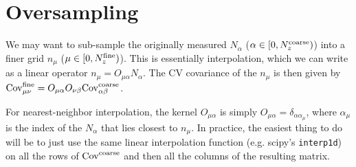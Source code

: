 \documentclass[a4paper,11pt]{article}
\begin{document}
\appendix
\section{Oversampling}
We may want to sub-sample the originally measured $N_{\alpha}$ ($\alpha\in[0,N_z^{\rm coarse})$) into a finer grid $n_{\mu}$ ($\mu\in[0,N_z^{\rm fine})$). This is essentially interpolation, which we can write as a linear operator $n_\mu = O_{\mu\alpha}N_{\alpha}$. The CV covariance of the $n_\mu$ is then given by ${\rm Cov}^{\rm fine}_{\mu\nu}=O_{\mu\alpha}O_{\nu\beta}{\rm Cov}^{\rm coarse}_{\alpha\beta}$.

For nearest-neighbor interpolation, the kernel $O_{\mu\alpha}$ is simply $O_{\mu\alpha}=\delta_{\alpha\alpha_\mu}$, where $\alpha_\mu$ is the index of the $N_\alpha$ that lies closest to $n_\mu$. In practice, the easiest thing to do will be to just use the same linear interpolation function (e.g. scipy's {\tt interp1d}) on all the rows of ${\rm Cov}^{\rm coarse}$ and then all the columns of the resulting matrix.



\end{document}
